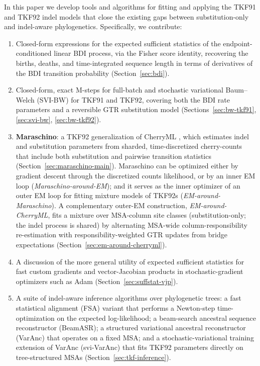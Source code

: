 In this paper we develop tools and algorithms for fitting and applying
the TKF91 and TKF92 indel models that close the existing gaps
between substitution-only and indel-aware phylogenetics.
Specifically, we contribute:
\begin{enumerate}
\item Closed-form expressions for the expected sufficient statistics of
the endpoint-conditioned linear BDI process, via the Fisher score
identity, recovering the births, deaths, and time-integrated
sequence length in terms of derivatives of the BDI transition
probability (Section~\ref{sec:bdi}).
\item Closed-form, exact M-steps for full-batch and stochastic
variational Baum--Welch (SVI-BW) for TKF91 and TKF92,
covering both the BDI rate parameters and a reversible GTR
substitution model (Sections~\ref{sec:bw-tkf91}, \ref{sec:svi-bw},
\ref{sec:bw-tkf92}).
\item \textbf{Maraschino}: a TKF92 generalization of CherryML
\cite{Prillo2022CherryML}, which estimates indel and substitution
parameters from sharded, time-discretized cherry-counts that include
both substitution and pairwise transition statistics
(Section~\ref{sec:maraschino-main}).  Maraschino can be optimized
either by gradient descent through the discretized counts likelihood,
or by an inner EM loop (\emph{Maraschino-around-EM}); and it
serves as the inner optimizer of an outer EM loop for fitting
mixture models of TKF92s (\emph{EM-around-Maraschino}).
A complementary outer-EM construction,
\emph{EM-around-CherryML}, fits a mixture over MSA-column site
classes (substitution-only; the indel process is shared) by
alternating MSA-wide column-responsibility re-estimation with
responsibility-weighted GTR updates from bridge expectations
(Section~\ref{sec:em-around-cherryml}).
\item A discussion of the more general utility of expected
sufficient statistics for fast custom gradients and vector-Jacobian
products in stochastic-gradient optimizers such as Adam
(Section~\ref{sec:suffstat-vjp}).
\item A suite of indel-aware inference algorithms over phylogenetic
trees: a fast statistical alignment (FSA) variant that performs a
Newton-step time-optimization on the expected log-likelihood;
a beam-search ancestral sequence reconstructor (BeamASR);
a structured variational ancestral reconstructor (VarAnc) that
operates on a fixed MSA; and a stochastic-variational training
extension of VarAnc (svi-VarAnc) that fits TKF92 parameters
directly on tree-structured MSAs (Section~\ref{sec:tkf-inference}).
\end{enumerate}

